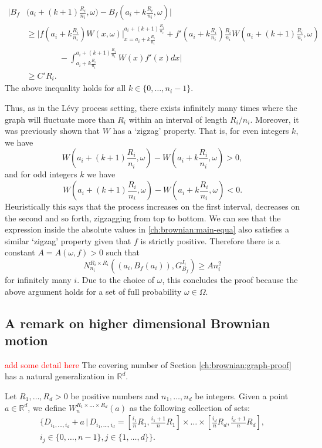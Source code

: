 	\begin{align}\label{ch:brownian:main-equa}
	    \bigg\vert B_f&\bigg(a_i+(k+1)\frac{R_i}{n_i},\omega\bigg)-B_f\left(a_i+k\frac{R_i}{n_i},\omega\right)\bigg\vert \\
	    &\ge \bigg\vert f\left(a_i + k \frac{R_i}{n_i}\right) W(x,\omega) \bigg\vert_{x=a_i+k\frac{R_i}{n_i}}^{a_i+(k+1)\frac{R_i}{n_i}} + f'\left(a_i + k\frac{R_i}{n_i}\right) \frac{R_i}{n_i} W\left(a_i +(k+1) \frac{R_i}{n_i},\omega\right) \nonumber\\ 
	    &\qquad \qquad- \int_{a_i+k \frac{R_i}{n_i}}^{a_i+(k+1)\frac{R_i}{n_1}}W(x)f'(x)dx \bigg\vert  \nonumber \\
	    & \ge C'R_i. \nonumber
	\end{align}
	The above inequality holds for all $k\in\{0,\dots,n_i-1\}$. 
	
	Thus, as in the L\'evy process setting, there exists infinitely many times where the graph will fluctuate more than $R_i$ within an interval of length $R_i/n_i$. Moreover, it was previously shown that $W$ has a `zigzag' property. That is, for even integers $k$, we have
	\[
	W\left(a_i+(k+1)\frac{R_i}{n_i},\omega\right)-W\left(a_i+k\frac{R_i}{n_i},\omega\right)>0,
	\] 
	and for odd integers $k$ we have
	\[
	W\left(a_i+(k+1)\frac{R_i}{n_i},\omega\right)-W\left(a_i+k\frac{R_i}{n_i},\omega\right)<0.
	\]  
	Heuristically this says that the process increases on the first interval, decreases on the second and so forth, zigzagging from top to bottom. We can see that the expression inside the absolute values in \eqref{ch:brownian:main-equa} also satisfies a similar `zigzag' property given that $f$ is strictly positive. Therefore there is a constant $A=A(\omega,f)>0$ such that
	\[
	N_{n_i}^{R_i\times R_i} \left( (a_i, B_f(a_i)), G_{B_f}^{I_i} \right) \ge  A n_i^2
	\] 
	for infinitely many $i$. Due to the choice of $\omega$, this concludes the proof because the above argument holds for a set of full probability $\omega\in\Omega$.





\subsection{A remark on higher dimensional Brownian motion}

\textcolor{red}{add some detail here}
The covering number of Section \ref{ch:brownian:graph-proof} has a natural generalization in $\mathbb{R}^d$.

Let $R_1,\dots,R_d>0$ be positive numbers and $n_1,\dots, n_d$ be integers. Given a point $a\in\mathbb{R}^d$, we define $W_{n}^{R_1\times\dots\times R_d}(a)$ as the following collection of sets:
\begin{eqnarray*}
	\Bigg\{D_{i_1,\dots,i_d}+a \, \vert \, D_{i_1,\dots,i_d}=\left[\frac{i_1}{n}R_1,\frac{i_1+1}{n}R_1\right]\times\dots\times \left[\frac{i_d}{n}R_d,\frac{i_d+1}{n}R_d\right],\\ i_j\in\{0,\dots,n-1\}, j\in\{1,\dots,d\}\Bigg\}.
\end{eqnarray*}
	

